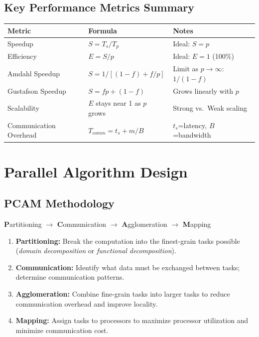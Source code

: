 \documentclass[11pt,a4paper]{article}
\begin{document}
\subsection{Key Performance Metrics Summary}

\begin{longtable}{@{}p{4cm}p{4.5cm}p{5.2cm}@{}}
\toprule
\rowcolor{primary!15}
\textbf{Metric} & \textbf{Formula} & \textbf{Notes} \\
\midrule
\endhead
Speedup & $S = T_s / T_p$ & Ideal: $S = p$ \\
Efficiency & $E = S / p$ & Ideal: $E = 1$ (100\%) \\
Amdahl Speedup & $S = 1 / [(1-f)+f/p]$ & Limit as $p \to \infty$: $1/(1-f)$ \\
Gustafson Speedup & $S = fp + (1-f)$ & Grows linearly with $p$ \\
Scalability & $E$ stays near 1 as $p$ grows & Strong vs.\ Weak scaling \\
Communication Overhead & $T_{comm} = t_s + m/B$ & $t_s$=latency, $B$=bandwidth \\
\bottomrule
\end{longtable}

\section{Parallel Algorithm Design}

\subsection{PCAM Methodology}

\begin{conceptbox}
\textbf{P}artitioning $\to$ \textbf{C}ommunication $\to$ \textbf{A}gglomeration $\to$ \textbf{M}apping
\begin{enumerate}[leftmargin=*, itemsep=3pt]
  \item \textbf{Partitioning:} Break the computation into the finest-grain tasks possible (\textit{domain decomposition} or \textit{functional decomposition}).
  \item \textbf{Communication:} Identify what data must be exchanged between tasks; determine communication patterns.
  \item \textbf{Agglomeration:} Combine fine-grain tasks into larger tasks to reduce communication overhead and improve locality.
  \item \textbf{Mapping:} Assign tasks to processors to maximize processor utilization and minimize communication cost.
\end{enumerate}
\end{conceptbox}
\end{document}

